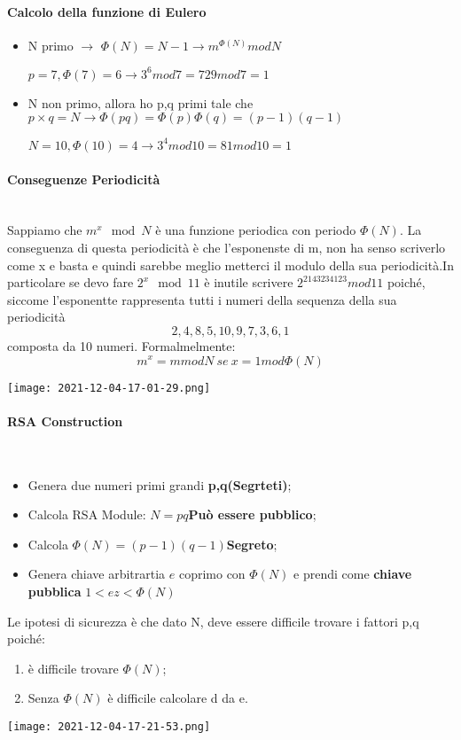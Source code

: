\documentclass{article}
\theoremstyle{remark}
\begin{document}
\paragraph{Calcolo della funzione di Eulero}
\begin{itemize}
	\item N primo \(\rightarrow\) \(\Phi(N)=N-1\rightarrow m^{\Phi(N)}mod N\)
	\begin{center}
		\(p=7,\Phi(7)=6\rightarrow 3^6 mod 7=729 mod 7=1\)
	\end{center}
	\item N non primo, allora ho p,q primi tale che \(p\times q=N\rightarrow \Phi(pq)=\Phi(p)\Phi(q)=(p-1)(q-1)\)
	\begin{center}
		\(N=10,\Phi(10)=4\rightarrow 3^4 mod 10 = 81 mod 10 = 1\)
	\end{center}
\end{itemize}
\paragraph{Conseguenze Periodicità}\mbox{}\\ Sappiamo che \(m^x \mod N \) è una funzione periodica con periodo \(\Phi(N)\). La conseguenza di questa periodicità è che l'esponenste di m, non ha senso scriverlo come x e basta e quindi sarebbe meglio metterci il modulo della sua periodicità.\newline In particolare se devo fare \(2^x \mod 11\) è inutile scrivere \(2^{2143234123} mod 11\) poiché, siccome l'esponentte rappresenta tutti i numeri della sequenza della sua periodicità \[2,4,8,5,10,9,7,3,6,1\] composta da 10 numeri. Formalmelmente:\begin{equation}
	m^x=m mod N\ se\ x=1 mod\Phi(N)
\end{equation}
\begin{center}
	\texttt{[image: 2021-12-04-17-01-29.png]}
\end{center}
\paragraph{RSA Construction}\mbox{}\\
\begin{itemize}
	\item Genera due numeri primi grandi \textbf{p,q(Segrteti)};
	\item Calcola RSA Module: \(N=pq\)\textbf{Può essere pubblico};
	\item Calcola \(\Phi(N)=(p-1)(q-1)\)\textbf{Segreto};
	\item Genera chiave arbitrartia \(e\) coprimo con \(\Phi(N)\) e prendi come \textbf{chiave pubblica} \(1<ez<\Phi(N)\)
\end{itemize}
Le ipotesi di sicurezza è che dato N, deve essere difficile trovare i fattori p,q poiché:\begin{enumerate}
	\item è difficile trovare \(\Phi(N)\);
	\item Senza \(\Phi(N)\) è difficile calcolare d da e.
\end{enumerate}
\begin{center}
	\texttt{[image: 2021-12-04-17-21-53.png]}
\end{center}
\end{document}

